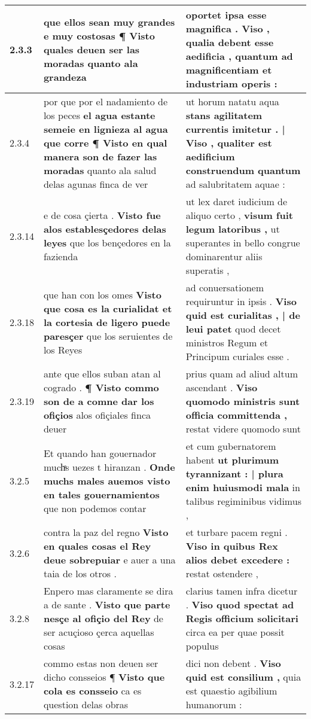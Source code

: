 \begin{tabular}{|p{1cm}|p{6.5cm}|p{6.5cm}|}
2.3.3 & que ellos sean muy grandes e muy costosas \textbf{ ¶ Visto quales deuen ser las moradas } quanto ala grandeza & oportet ipsa esse magnifica . \textbf{ Viso , qualia debent esse aedificia , } quantum ad magnificentiam et industriam operis : \\\hline
2.3.4 & por que por el nadamiento de los peces \textbf{ el agua estante semeie en lignieza al agua que corre ¶ Visto en qual manera son de fazer las moradas } quanto ala salud delas agunas finca de ver & ut horum natatu aqua \textbf{ stans agilitatem currentis imitetur . | Viso , qualiter est aedificium construendum quantum } ad salubritatem aquae : \\\hline
2.3.14 & e de cosa çierta . \textbf{ Visto fue alos establesçedores delas leyes } que los bençedores en la fazienda & ut lex daret iudicium de aliquo certo , \textbf{ visum fuit legum latoribus , } ut superantes in bello congrue dominarentur aliis superatis , \\\hline
2.3.18 & que han con los omes \textbf{ Visto que cosa es la curialidat et la cortesia de ligero puede paresçer } que los seruientes de los Reyes & ad conuersationem requiruntur in ipsis . \textbf{ Viso quid est curialitas , | de leui patet } quod decet ministros Regum et Principum curiales esse . \\\hline
2.3.19 & ante que ellos suban atan al cogrado . \textbf{ ¶ Visto commo son de a comne dar los ofiçios } alos ofiçiales finca deuer & prius quam ad aliud altum ascendant . \textbf{ Viso quomodo ministris sunt officia committenda , } restat videre quomodo sunt \\\hline
3.2.5 & Et quando han gouernador muchͣs uezes t hiranzan . \textbf{ Onde muchs males auemos visto en tales gouernamientos } que non podemos contar & et cum gubernatorem habent \textbf{ ut plurimum tyrannizant : | plura enim huiusmodi mala } in talibus regiminibus vidimus , \\\hline
3.2.6 & contra la paz del regno \textbf{ Visto en quales cosas el Rey deue sobrepuiar } e auer a una taia de los otros . & et turbare pacem regni . \textbf{ Viso in quibus Rex alios debet excedere : } restat ostendere , \\\hline
3.2.8 & Enpero mas claramente se dira a de sante . \textbf{ Visto que parte nesçe al ofiçio del Rey } de ser acuçioso çerca aquellas cosas & clarius tamen infra dicetur . \textbf{ Viso quod spectat ad Regis officium solicitari } circa ea per quae possit populus \\\hline
3.2.17 & commo estas non deuen ser dicho consseios ¶ \textbf{ Visto que cola es consseio } ca es question delas obras & dici non debent . \textbf{ Viso quid est consilium , } quia est quaestio agibilium humanorum : \\\hline

\end{tabular}

